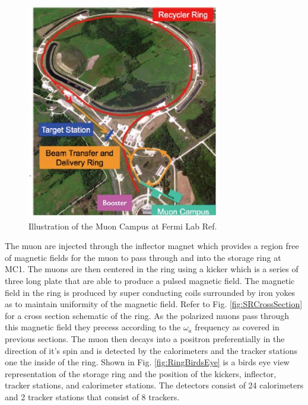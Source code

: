 \documentclass[./Thesis]{subfiles}
\begin{document}
\begin{figure}
\centerline{\includegraphics[height=95mm]{MuonCampus.jpg}}
\caption[ Muon Campus Fermi Lab]{ Illustration of the Muon Campus at Fermi Lab  Ref. \cite{MuonCampus}
	}
\label{fig:MuonCampus}
\end{figure}	


	The muon are injected  through the inflector magnet which provides a region free of magnetic fields for the muon to pass through and into the storage ring at MC1. The muons are then centered in the ring using a kicker which is a series of three long plate that are able to produce a pulsed magnetic field. The magnetic field in the ring is produced by super conducting coils surrounded by iron yokes as to maintain uniformity of the magnetic field. Refer to Fig. \ref{fig:SRCrossSection} for a cross section schematic of the ring. As the polarized muons pass through this magnetic field they precess according to the $\omega_a$ frequency as covered in previous sections. The muon then decays into a positron preferentially in the direction of it's spin and is detected by the calorimeters and the tracker stations one the inside of the ring. Shown in Fig. \ref{fig:RingBirdsEye} is a birds eye view representation of the storage ring and the position of the kickers, inflector, tracker stations, and calorimeter stations. The detectors consist of 24 calorimeters and 2 tracker stations that consist of 8 trackers. 
	
\end{document}

